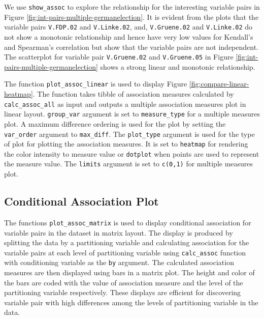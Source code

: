We use \texttt{show\_assoc} to explore the relationship for the
interesting variable pairs in Figure
\ref{fig:int-pairs-multiple-germanelection}. It is evident from the
plots that the variable pairs \texttt{V.FDP.02} and \texttt{V.Linke.02},
and, \texttt{V.Gruene.02} and \texttt{V.Linke.02} do not show a
monotonic relationship and hence have very low values for Kendall's and
Spearman's correlation but show that the variable pairs are not
independent. The scatterplot for variable pair \texttt{V.Gruene.02} and
\texttt{V.Gruene.05} in Figure
\ref{fig:int-pairs-multiple-germanelection} shows a strong linear and
monotonic relationship.

The function \texttt{plot\_assoc\_linear} is used to display Figure
\ref{fig:compare-linear-heatmap}. The function takes tibble of
association measures calculated by \texttt{calc\_assoc\_all} as input
and outputs a multiple association measures plot in linear layout.
\texttt{group\_var} argument is set to \texttt{measure\_type} for a
multiple measures plot. A maximum difference ordering is used for the
plot by setting the \texttt{var\_order} argument to \texttt{max\_diff}.
The \texttt{plot\_type} argument is used for the type of plot for
plotting the association measures. It is set to \texttt{heatmap} for
rendering the color intensity to measure value or \texttt{dotplot} when
points are used to represent the measure value. The \texttt{limits}
argument is set to \texttt{c(0,1)} for multiple measures plot.

\hypertarget{conditional-association-plot}{%
\subsection{Conditional Association
Plot}\label{conditional-association-plot}}

The functions \texttt{plot\_assoc\_matrix} is used to display
conditional association for variable pairs in the dataset in matrix
layout. The display is produced by splitting the data by a partitioning
variable and calculating association for the variable pairs at each
level of partitioning variable using \texttt{calc\_assoc} function with
conditioning variable as the \texttt{by} argument. The calculated
association measures are then displayed using bars in a matrix plot. The
height and color of the bars are coded with the value of association
measure and the level of the partitioning variable respectively. These
displays are efficient for discovering variable pair with high
differences among the levels of partitioning variable in the data.

